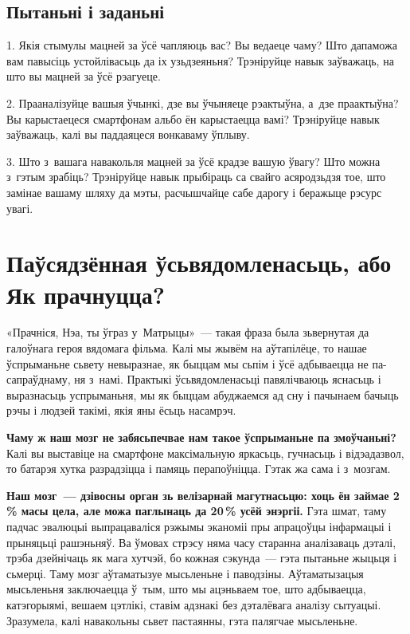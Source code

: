 \subsection*{Пытаньні і заданьні}

1. Якія стымулы мацней за ўсё чапляюць вас? Вы ведаеце чаму? Што дапаможа вам павысіць устойлівасьць да іх узьдзеяньня? Трэніруйце навык заўважаць, на што вы мацней за ўсё рэагуеце.

2. Прааналізуйце вашыя ўчынкі, дзе вы ўчыняеце рэактыўна, а~дзе праактыўна? Вы карыстаецеся смартфонам альбо ён карыстаецца вамі? Трэніруйце навык заўважаць, калі вы паддаяцеся вонкаваму ўплыву.

3. Што з~вашага навакольля мацней за ўсё крадзе вашую ўвагу? Што можна з~гэтым зрабіць? Трэніруйце навык прыбіраць са свайго асяродзьдзя тое, што замінае вашаму шляху да мэты, расчышчайце сабе дарогу і беражыце рэсурс увагі.


\section{Паўсядзённая ўсьвядомленасьць, або Як прачнуцца?}

«Прачніся, Нэа, ты ўграз у~Матрыцы»~--- такая фраза была зьвернутая да галоўнага героя вядомага фільма. Калі мы жывём на аўтапілёце, то нашае ўспрыманьне сьвету невыразнае, як быццам мы сьпім і ўсё адбываецца не па-сапраўднаму, ня з~намі. Практыкі ўсьвядомленасьці павялічваюць яснасьць і выразнасьць успрыманьня, мы як быццам абуджаемся ад сну і пачынаем бачыць рэчы і людзей такімі, якія яны ёсьць насамрэч.

\textbf{Чаму ж наш мозг не забясьпечвае нам такое ўспрыманьне па змоўчаньні?} Калі вы выставіце на смартфоне максімальную яркасьць, гучнасьць і відэадазвол, то батарэя хутка разрадзіцца і памяць перапоўніцца. Гэтак жа сама і з~мозгам. 

\textbf{Наш мозг~--- дзівосны орган зь велізарнай магутнасьцю: хоць ён займае 2\,\% масы цела, але можа паглынаць да 20\,\% усёй энэргіі.} Гэта шмат, таму падчас эвалюцыі выпрацаваліся рэжымы эканоміі пры апрацоўцы інфармацыі і прыняцьці рашэньняў. Ва ўмовах стрэсу няма часу старанна аналізаваць дэталі, трэба дзейнічаць як мага хутчэй, бо кожная сэкунда~--- гэта пытаньне жыцьця і сьмерці. Таму мозг аўтаматызуе мысьленьне і паводзіны. Аўтаматызацыя мысьленьня заключаецца ў~тым, што мы ацэньваем тое, што адбываецца, катэгорыямі, вешаем цэтлікі, ставім адзнакі без дэталёвага аналізу сытуацыі. Зразумела, калі навакольны сьвет пастаянны, гэта палягчае мысьленьне. 

